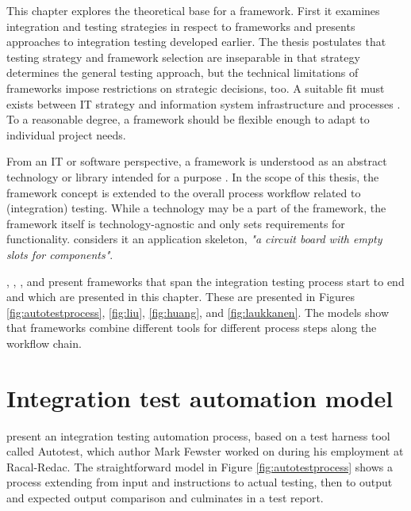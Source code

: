 \documentclass[12pt,a4paper,oneside,pdftex]{report}
\begin{document}
This chapter explores the theoretical base for a framework. First it examines integration and testing strategies in respect to frameworks and presents approaches to integration testing developed earlier. The thesis postulates that testing strategy and framework selection are inseparable in that strategy determines the general testing approach, but the technical limitations of frameworks impose restrictions on strategic decisions, too. A suitable fit must exists between IT strategy and information system infrastructure and processes \citep{henderson1993strategic}. To a reasonable degree, a framework should be flexible enough to adapt to individual project needs.


From an IT or software perspective, a framework is understood as an abstract technology or library intended for a purpose \citep{johnson1988designing}. In the scope of this thesis, the framework concept is extended to the overall process workflow related to (integration) testing. While a technology may be a part of the framework, the framework itself is technology-agnostic and only sets requirements for functionality. \citet{pezze2008software} considers it an application skeleton, \textit{"a circuit board with empty slots for components"}. 

\citet{fewster1999software}, \citet{liu2009unified}, \citet{huang2008surrogate}, and \citet{laukkanen2006data} present frameworks that span the integration testing process start to end and which are presented in this chapter. These are presented in Figures \ref{fig:autotestprocess}, \ref{fig:liu}, \ref{fig:huang}, and \ref{fig:laukkanen}. The models show that frameworks combine different tools for different process steps along the workflow chain.

\section{Integration test automation model}

\citet{fewster1999software} present an integration testing automation process, based on a test harness tool called Autotest, which author Mark Fewster worked on during his employment at Racal-Redac. The straightforward model in Figure \ref{fig:autotestprocess} shows a process extending from input and instructions to actual testing, then to output and expected output comparison and culminates in a test report.
\end{document}
